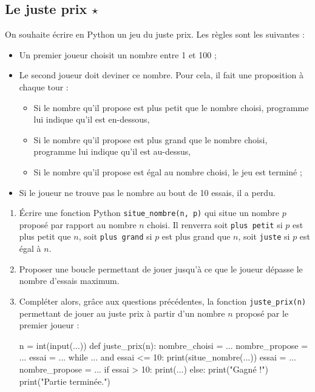 \documentclass[12pt,a4paper, oneside]{article}
\begin{document}
   \subsection{Le juste prix $\star$}\label{subsec:le-juste-prix}
   On souhaite écrire en Python un jeu du juste prix.
   Les règles sont les suivantes :
   \begin{itemize}
      \item Un premier joueur choisit un nombre entre 1 et 100 ;
      \item Le second joueur doit deviner ce nombre.
      Pour cela, il fait une proposition à chaque tour :
      \begin{itemize}
         \item Si le nombre qu'il propose est plus petit que le nombre choisi, programme lui indique qu'il est en-dessous,
         \item Si le nombre qu'il propose est plus grand que le nombre choisi, programme lui indique qu'il est au-dessus,
         \item Si le nombre qu'il propose est égal au nombre choisi, le jeu est terminé ;
      \end{itemize}
      \item Si le joueur ne trouve pas le nombre au bout de 10 essais, il a perdu.
   \end{itemize}

   \begin{enumerate}
      \item Écrire une fonction Python \texttt{situe\_nombre(n, p)} qui situe un nombre $p$ proposé par rapport au nombre $n$ choisi.
      Il renverra soit \texttt{plus petit} si $p$ est plus petit que $n$, soit \texttt{plus grand} si $p$ est plus grand que $n$, soit \texttt{juste} si $p$ est égal à $n$.
      \item Proposer une boucle permettant de jouer jusqu'à ce que le joueur dépasse le nombre d'essais maximum.
      \item Compléter alors, grâce aux questions précédentes, la fonction \texttt{juste\_prix(n)} permettant de jouer au juste prix à partir d'un nombre $n$ proposé par le premier joueur :
      \begin{pyverbatim}
         n = int(input(...))
         def juste_prix(n):
            nombre_choisi = ...
            nombre_propose = ...
            essai = ...
            while ... and essai <= 10:
               print(situe_nombre(...))
               essai = ...
               nombre_propose = ...
            if essai > 10:
               print(...)
            else:
               print("Gagné !")
            print("Partie terminée.")
      \end{pyverbatim}
   \end{enumerate}
\end{document}
